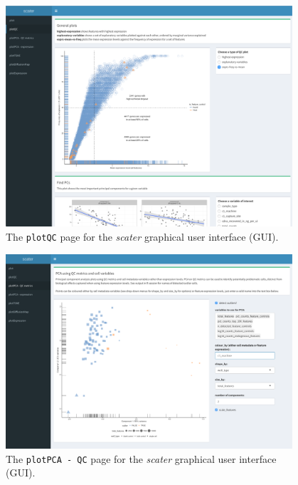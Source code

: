 \documentclass{revtex4}
\begin{document}
\begin{figure}[!tpb]
\centerline{\includegraphics[width=0.95\textwidth]{figures/scater_gui_plotqc.pdf}}
\caption{The \texttt{plotQC} page for the \emph{scater} graphical user interface (GUI).}\label{fig:scater-plotqc}
\end{figure}


\begin{figure}[!tpb]
\centerline{\includegraphics[width=0.95\textwidth]{figures/scater_gui_pca_qc.pdf}}
\caption{The \texttt{plotPCA - QC} page for the \emph{scater} graphical user interface (GUI).}\label{fig:scater-pca-qc}
\end{figure}




%
%
%
%
%

\end{document}
